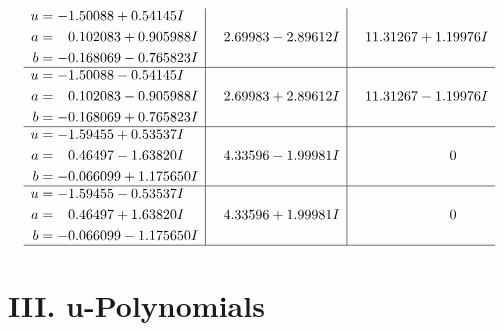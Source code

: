 \documentclass[1p]{elsarticle_modified}
\theoremstyle{definition}
\begin{document}
$$\begin{array}{c|c|c}
\begin{aligned}
u &= -1.50088 + 0.54145 I \\
a &= \phantom{-}0.102083 + 0.905988 I \\
b &= -0.168069 - 0.765823 I\end{aligned}
 & \phantom{-}2.69983 - 2.89612 I & \phantom{-}11.31267 + 1.19976 I \\ \hline\begin{aligned}
u &= -1.50088 - 0.54145 I \\
a &= \phantom{-}0.102083 - 0.905988 I \\
b &= -0.168069 + 0.765823 I\end{aligned}
 & \phantom{-}2.69983 + 2.89612 I & \phantom{-}11.31267 - 1.19976 I \\ \hline\begin{aligned}
u &= -1.59455 + 0.53537 I \\
a &= \phantom{-}0.46497 - 1.63820 I \\
b &= -0.066099 + 1.175650 I\end{aligned}
 & \phantom{-}4.33596 - 1.99981 I & \phantom{-0.000000 } 0 \\ \hline\begin{aligned}
u &= -1.59455 - 0.53537 I \\
a &= \phantom{-}0.46497 + 1.63820 I \\
b &= -0.066099 - 1.175650 I\end{aligned}
 & \phantom{-}4.33596 + 1.99981 I & \phantom{-0.000000 } 0\\
 \hline 
 \end{array}$$\newpage
\newpage\renewcommand{\arraystretch}{1}
\centering \section*{ III. u-Polynomials}
\end{document}
